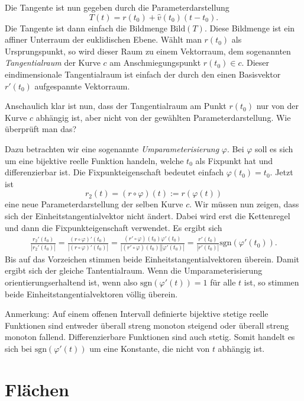 \documentclass[a4paper,12pt,fleqn]{article}
\begin{document}
Die Tangente ist nun gegeben durch die Parameterdarstellung
\begin{equation}
T(t) = r(t_0)+\hat v(t_0)(t-t_0).
\end{equation}
Die Tangente ist dann einfach die Bildmenge \(\mathrm{Bild}(T)\).
Diese Bildmenge ist ein affiner Unterraum der euklidischen
Ebene. Wählt man \(r(t_0)\) als Ursprungspunkt, so wird dieser Raum
zu einem Vektorraum, dem sogenannten \textit{Tangentialraum} der
Kurve \(c\) am Anschmiegungspunkt \(r(t_0)\in c\). Dieser
eindimensionale Tangentialraum ist einfach der durch den
einen Basisvektor \(r'(t_0)\) aufgespannte Vektorraum.

Anschaulich klar ist nun, dass der Tangentialraum am Punkt \(r(t_0)\)
nur von der Kurve \(c\) abhängig ist, aber nicht von der gewählten
Parameterdarstellung. Wie überprüft man das?

Dazu betrachten wir eine sogenannte \textit{Umparameterisierung}
\(\varphi\). Bei \(\varphi\) soll es sich um eine bijektive
reelle Funktion handeln, welche \(t_0\) als Fixpunkt hat und
differenzierbar ist. Die Fixpunkteigenschaft bedeutet einfach
\(\varphi(t_0)=t_0\). Jetzt ist
\begin{equation}
r_2(t) = (r\circ\varphi)(t):=r(\varphi(t))
\end{equation}
eine neue Parameterdarstellung der selben Kurve \(c\).
Wir müssen nun zeigen, dass sich der Einheitstangentialvektor
nicht ändert. Dabei wird erst die Kettenregel und dann die
Fixpunkteigenschaft verwendet. Es ergibt sich
\begin{gather*}
\frac{r_2'(t_0)}{|r_2'(t_0)|}
= \frac{(r\circ\varphi)'(t_0)}{|(r\circ\varphi)'(t_0)|}
= \frac{(r'\circ\varphi)(t_0)\varphi'(t_0)}{|(r'\circ\varphi)(t_0)||\varphi'(t_0)|}
= \frac{r'(t_0)}{|r'(t_0)|} \mathrm{sgn}(\varphi'(t_0)).
\end{gather*}
Bis auf das Vorzeichen stimmen beide Einheitstangentialvektoren
überein. Damit ergibt sich der gleiche Tantentialraum. Wenn die
Umparameterisierung orientierungserhaltend ist, wenn also
\(\mathrm{sgn}(\varphi'(t))=1\) für alle \(t\) ist, so stimmen
beide Einheitstangentialvektoren völlig überein.

Anmerkung: Auf einem offenen Intervall definierte bijektive
stetige reelle
Funktionen sind entweder überall streng monoton steigend oder überall
streng monoton fallend. Differenzierbare Funktionen sind auch stetig.
Somit handelt es sich bei \(\mathrm{sgn}(\varphi'(t))\) um eine
Konstante, die nicht von \(t\) abhängig ist.

\section{Flächen}
\end{document}
